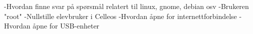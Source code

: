 


-Hvordan finne svar p\aa{} sp\o rsm\aa l relatert til linux, gnome, debian osv
-Brukeren "root"
-Nullstille elevbruker i Celleos
-Hvordan \aa pne for internettforbindelse
-Hvordan \aa pne for USB-enheter

\vfill\eject\bye

